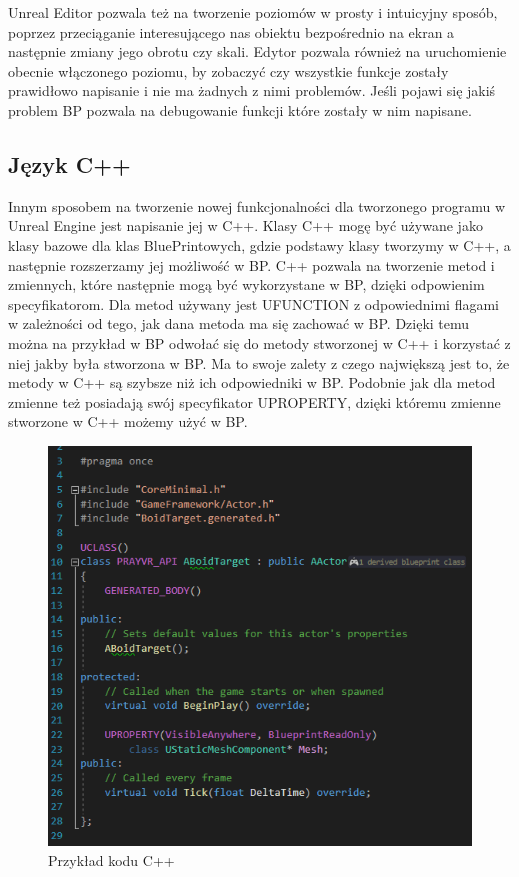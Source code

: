 \documentclass[a4paper,12pt,reqno]{article}
\begin{document}
Unreal Editor pozwala też na tworzenie poziomów w prosty i intuicyjny sposób, poprzez przeciąganie interesującego nas obiektu bezpośrednio na ekran a następnie zmiany jego obrotu czy skali. Edytor pozwala również na uruchomienie obecnie włączonego poziomu, by zobaczyć czy wszystkie funkcje zostały prawidłowo napisanie i nie ma żadnych z nimi problemów. Jeśli pojawi się jakiś problem BP pozwala na debugowanie funkcji które zostały w nim napisane. 
\subsection{Język C++}

Innym sposobem na tworzenie nowej funkcjonalności dla tworzonego programu w Unreal Engine jest napisanie jej w C++. Klasy C++ mogę być używane jako klasy bazowe dla klas BluePrintowych, gdzie podstawy klasy tworzymy w C++, a następnie rozszerzamy jej możliwość w BP. C++ pozwala na tworzenie metod i zmiennych, które następnie mogą być wykorzystane w BP, dzięki odpowienim specyfikatorom. Dla metod używany jest UFUNCTION z odpowiednimi flagami w zależności od tego, jak dana metoda ma się zachować w BP. Dzięki temu można na przykład w BP odwołać się do metody stworzonej w C++ i korzystać z niej jakby była stworzona w BP. Ma to swoje zalety z czego największą jest to, że metody w C++ są szybsze niż ich odpowiedniki w BP. Podobnie jak dla metod zmienne też posiadają swój specyfikator UPROPERTY, dzięki któremu zmienne stworzone w C++ możemy użyć w BP.

\begin{figure}[H]%
\centering
\includegraphics[width=0.8\columnwidth]{graphics/CppInherited.png}
\caption{Przykład kodu C++
\label{CppInherited}}%
%
\qquad
\end{figure}   
\end{document}
